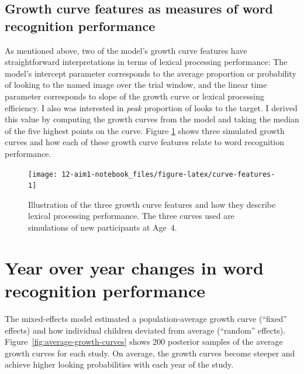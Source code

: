 \documentclass [11pt, proquest] {uwthesis}[2015/03/03]
\begin{document}
\subsection{Growth curve features as measures of word recognition
performance}\label{growth-curve-features-as-measures-of-word-recognition-performance}

As mentioned above, two of the model's growth curve features have
straightforward interpretations in terms of lexical processing
performance: The model's intercept parameter corresponds to the average
proportion or probability of looking to the named image over the trial
window, and the linear time parameter corresponds to slope of the growth
curve or lexical processing efficiency. I also was interested in
\emph{peak} proportion of looks to the target. I derived this value by
computing the growth curves from the model and taking the median of the
five highest points on the curve. Figure \ref{fig:curve-features} shows
three simulated growth curves and how each of these growth curve
features relate to word recognition performance.




\begin{figure}
\texttt{[image: 12-aim1-notebook\_files/figure-latex/curve-features-1]} \caption{Illustration of the three growth curve features and
how they describe lexical processing performance. The three curves used
are simulations of new participants at Age~4.}\label{fig:curve-features}
\end{figure}
\section{Year over year changes in word recognition
performance}\label{year-over-year-changes-in-word-recognition-performance}

The mixed-effects model estimated a population-average growth curve
(``fixed'' effects) and how individual children deviated from average
(``random'' effects). Figure~\ref{fig:average-growth-curves} shows 200
posterior samples of the average growth curves for each study. On
average, the growth curves become steeper and achieve higher looking
probabilities with each year of the study.
\end{document}
